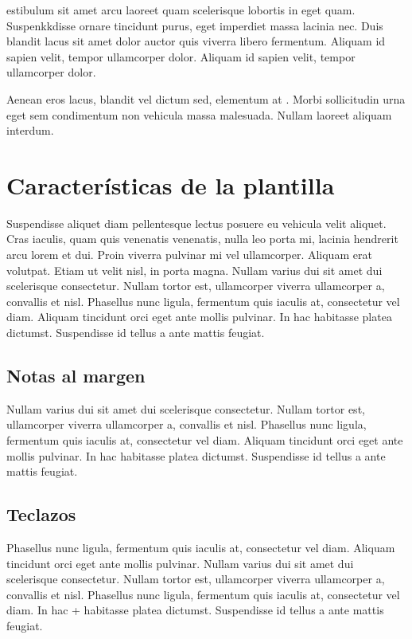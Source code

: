 estibulum sit amet arcu laoreet quam scelerisque lobortis in eget quam. Suspenkkdisse ornare tincidunt purus, eget imperdiet massa lacinia nec. Duis blandit lacus sit amet dolor auctor quis viverra libero fermentum. Aliquam id sapien velit, tempor ullamcorper dolor. Aliquam id sapien velit, tempor ullamcorper dolor.

Aenean eros lacus, blandit vel dictum sed, elementum at . Morbi sollicitudin urna eget sem condimentum non vehicula massa malesuada. Nullam laoreet aliquam interdum.

\section{Características de la plantilla}

Suspendisse aliquet diam pellentesque lectus posuere eu vehicula velit aliquet. Cras iaculis, quam quis venenatis venenatis, nulla leo porta mi, lacinia hendrerit arcu lorem et dui. Proin viverra pulvinar mi vel ullamcorper. Aliquam erat volutpat. Etiam ut velit nisl, in porta magna. Nullam varius dui sit amet dui scelerisque consectetur. Nullam tortor est, ullamcorper viverra ullamcorper a, convallis et nisl. Phasellus nunc ligula, fermentum quis iaculis at, consectetur vel diam. Aliquam tincidunt orci eget ante mollis pulvinar. In hac habitasse platea dictumst. Suspendisse id tellus a ante mattis feugiat. 

\subsection{Notas al margen}


Nullam varius dui sit amet dui scelerisque consectetur. Nullam tortor est, ullamcorper viverra ullamcorper a, convallis et nisl. Phasellus nunc ligula, fermentum quis iaculis at, consectetur vel diam. Aliquam tincidunt orci eget ante mollis pulvinar. In hac habitasse platea dictumst. Suspendisse id tellus a ante mattis feugiat. 

\subsection{Teclazos}

Phasellus nunc ligula, fermentum quis iaculis at, consectetur vel diam. Aliquam tincidunt orci eget ante mollis pulvinar. Nullam varius dui sit amet dui scelerisque consectetur. Nullam tortor est, ullamcorper viverra ullamcorper a, convallis et nisl. Phasellus nunc ligula, fermentum quis iaculis at, consectetur vel diam. In hac + habitasse platea dictumst. Suspendisse id tellus a ante mattis feugiat. 

